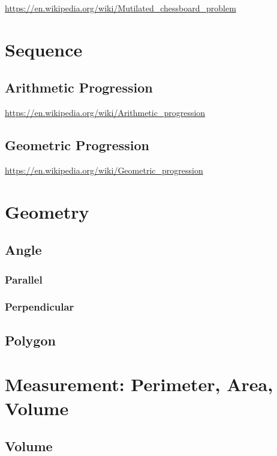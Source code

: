 \url{https://en.wikipedia.org/wiki/Mutilated_chessboard_problem}

\chapter{Sequence}
\label{chap:sequence}

\section{Arithmetic Progression}
\label{sec:arithmetic-progression}
\url{https://en.wikipedia.org/wiki/Arithmetic_progression}

\section{Geometric Progression}
\label{sec:geometric-progression}
\url{https://en.wikipedia.org/wiki/Geometric_progression}

\chapter{Geometry}
\label{chap:geometry}

\section{Angle}
\label{sec:angle}

\subsection{Parallel}
\label{sec:parallel}

\subsection{Perpendicular}
\label{sec:perpendicular}


\section{Polygon}
\label{sec:polygon}



\chapter{Measurement: Perimeter, Area, Volume}
\label{chap:perimeter-area-volume}

\section{Volume}
\label{sec:volume}

